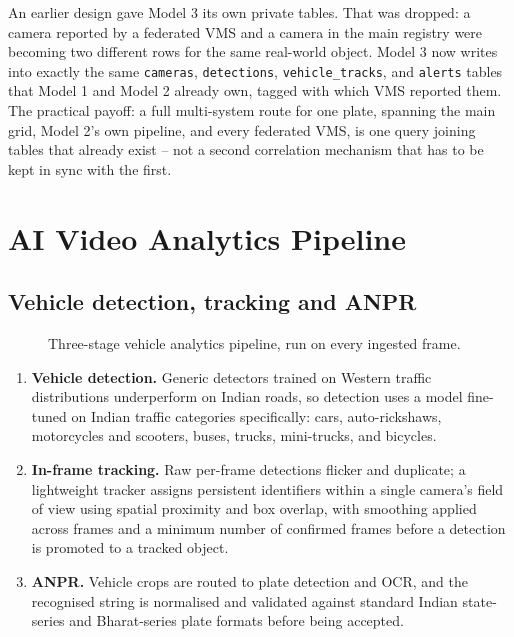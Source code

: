 \documentclass[11pt,a4paper]{article}
\begin{document}
An earlier design gave Model 3 its own private tables. That was dropped:
a camera reported by a federated VMS and a camera in the main registry
were becoming two different rows for the same real-world object. Model 3
now writes into exactly the same \texttt{cameras}, \texttt{detections},
\texttt{vehicle\_tracks}, and \texttt{alerts} tables that Model 1 and Model
2 already own, tagged with which VMS reported them. The practical payoff:
a full multi-system route for one plate, spanning the main grid, Model 2's
own pipeline, and every federated VMS, is one query joining tables that
already exist -- not a second correlation mechanism that has to be kept in
sync with the first.

\section{AI Video Analytics Pipeline}
\label{sec:analytics}

\subsection{Vehicle detection, tracking and ANPR}

\begin{figure}[h]
\centering

\caption{Three-stage vehicle analytics pipeline, run on every ingested frame.}
\label{fig:analytics-pipeline}
\end{figure}

\begin{enumerate}
\item \textbf{Vehicle detection.} Generic detectors trained on Western
  traffic distributions underperform on Indian roads, so detection uses a
  model fine-tuned on Indian traffic categories specifically: cars,
  auto-rickshaws, motorcycles and scooters, buses, trucks, mini-trucks, and
  bicycles.
\item \textbf{In-frame tracking.} Raw per-frame detections flicker and
  duplicate; a lightweight tracker assigns persistent identifiers within a
  single camera's field of view using spatial proximity and box overlap,
  with smoothing applied across frames and a minimum number of confirmed
  frames before a detection is promoted to a tracked object.
\item \textbf{ANPR.} Vehicle crops are routed to plate detection and OCR,
  and the recognised string is normalised and validated against standard
  Indian state-series and Bharat-series plate formats before being accepted.
\end{enumerate}
\end{document}
